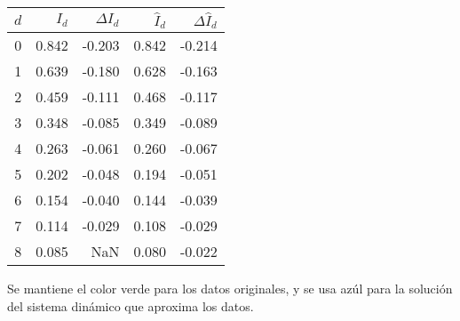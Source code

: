 \documentclass[11pt]{article}
\begin{document}
    \begin{tabular}{rrrrr}
\toprule
 $d$ &  $I_d$ &  $\Delta I_d$ &  $\hat I_d$ &  $\Delta \hat I_d$ \\
\midrule
   0 &  0.842 &        -0.203 &       0.842 &             -0.214 \\
   1 &  0.639 &        -0.180 &       0.628 &             -0.163 \\
   2 &  0.459 &        -0.111 &       0.468 &             -0.117 \\
   3 &  0.348 &        -0.085 &       0.349 &             -0.089 \\
   4 &  0.263 &        -0.061 &       0.260 &             -0.067 \\
   5 &  0.202 &        -0.048 &       0.194 &             -0.051 \\
   6 &  0.154 &        -0.040 &       0.144 &             -0.039 \\
   7 &  0.114 &        -0.029 &       0.108 &             -0.029 \\
   8 &  0.085 &           NaN &       0.080 &             -0.022 \\
\bottomrule
\end{tabular}

    Se mantiene el color verde para los datos originales, y se usa azúl para
la solución del sistema dinámico que aproxima los datos.
\end{document}
